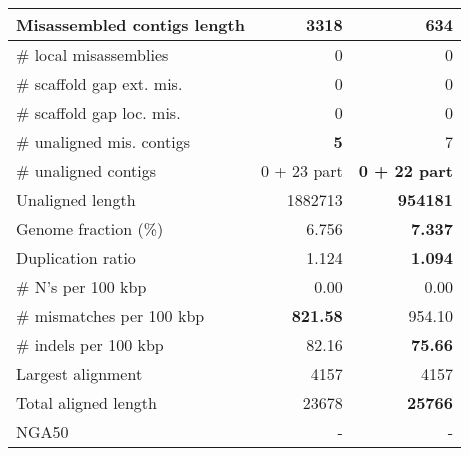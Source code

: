 \documentclass[12pt,a4paper]{article}
\begin{document}
\begin{table}[ht]
\begin{center}
\begin{tabular}{|l*{2}{|r}|}
Misassembled contigs length & 3318 & {\bf 634} \\ \hline
\# local misassemblies & 0 & 0 \\ \hline
\# scaffold gap ext. mis. & 0 & 0 \\ \hline
\# scaffold gap loc. mis. & 0 & 0 \\ \hline
\# unaligned mis. contigs & {\bf 5} & 7 \\ \hline
\# unaligned contigs & 0 + 23 part & {\bf 0 + 22 part} \\ \hline
Unaligned length & 1882713 & {\bf 954181} \\ \hline
Genome fraction (\%) & 6.756 & {\bf 7.337} \\ \hline
Duplication ratio & 1.124 & {\bf 1.094} \\ \hline
\# N's per 100 kbp & 0.00 & 0.00 \\ \hline
\# mismatches per 100 kbp & {\bf 821.58} & 954.10 \\ \hline
\# indels per 100 kbp & 82.16 & {\bf 75.66} \\ \hline
Largest alignment & 4157 & 4157 \\ \hline
Total aligned length & 23678 & {\bf 25766} \\ \hline
NGA50 & - & - \\ \hline
\end{tabular}
\end{center}
\end{table}
\end{document}
